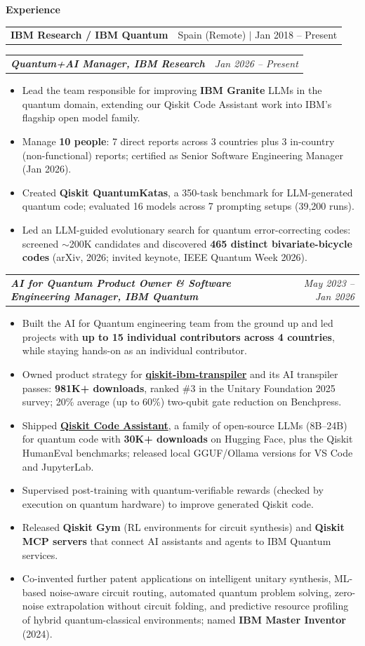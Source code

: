 \documentclass[a4paper,10pt]{article}
\makeatletter
\newcommand{\cvsection}[1]{%
  \vspace{2.5mm}%
  \begin{tcolorbox}{\headfont\bfseries\large\color{accent} #1}\end{tcolorbox}%
  \vspace{-1.5mm}%
}
\newcommand{\employer}[2]{%
  \begin{tabularx}{\linewidth}{@{}X r@{}}
    {\headfont\bfseries\large #1} & \footnotesize #2
  \end{tabularx}\par\vspace{0.6mm}}
\newcommand{\role}[2]{%
  \begin{tabularx}{\linewidth}{@{}X r@{}}
    \textbf{\textit{#1}} & \textit{\footnotesize #2}
  \end{tabularx}\par}
\newenvironment{bullets}
  {\begin{justify}\begin{itemize}[leftmargin=3ex, rightmargin=0.5ex, noitemsep, topsep=0.8mm, labelsep=1.2mm]\small}
  {\end{itemize}\end{justify}\vspace{1.2mm}}
\makeatother
\begin{document}
\cvsection{Experience}

\employer{IBM Research / IBM Quantum}{Spain (Remote) $\vert$ Jan 2018 -- Present}

\role{Quantum+AI Manager, IBM Research}{Jan 2026 -- Present}
\begin{bullets}
  \item Lead the team responsible for improving \textbf{IBM Granite} LLMs in the quantum domain, extending our Qiskit Code Assistant work into IBM's flagship open model family.
  \item Manage \textbf{10 people}: 7 direct reports across 3 countries plus 3 in-country (non-functional) reports; certified as Senior Software Engineering Manager (Jan 2026).
  \item Created \textbf{Qiskit QuantumKatas}, a 350-task benchmark for LLM-generated quantum code; evaluated 16 models across 7 prompting setups (39,200 runs).
  \item Led an LLM-guided evolutionary search for quantum error-correcting codes: screened $\sim$200K candidates and discovered \textbf{465 distinct bivariate-bicycle codes} (arXiv, 2026; invited keynote, IEEE Quantum Week 2026).
\end{bullets}

\role{AI for Quantum Product Owner \textnormal{\&} Software Engineering Manager, IBM Quantum}{May 2023 -- Jan 2026}
\begin{bullets}
  \item Built the AI for Quantum engineering team from the ground up and led projects with \textbf{up to 15 individual contributors across 4 countries}, while staying hands-on as an individual contributor.
  \item Owned product strategy for \textbf{\href{https://github.com/Qiskit/qiskit-ibm-transpiler}{qiskit-ibm-transpiler}} and its AI transpiler passes: \textbf{981K+ downloads}, ranked \#3 in the Unitary Foundation 2025 survey; 20\% average (up to 60\%) two-qubit gate reduction on Benchpress.
  \item Shipped \textbf{\href{https://huggingface.co/collections/Qiskit/qiskit-llms-67337b513e8718191b0a6ff6}{Qiskit Code Assistant}}, a family of open-source LLMs (8B--24B) for quantum code with \textbf{30K+ downloads} on Hugging Face, plus the Qiskit HumanEval benchmarks; released local GGUF/Ollama versions for VS Code and JupyterLab.
  \item Supervised post-training with quantum-verifiable rewards (checked by execution on quantum hardware) to improve generated Qiskit code.
  \item Released \textbf{Qiskit Gym} (RL environments for circuit synthesis) and \textbf{Qiskit MCP servers} that connect AI assistants and agents to IBM Quantum services.
  \item Co-invented further patent applications on intelligent unitary synthesis, ML-based noise-aware circuit routing, automated quantum problem solving, zero-noise extrapolation without circuit folding, and predictive resource profiling of hybrid quantum-classical environments; named \textbf{IBM Master Inventor} (2024).
\end{bullets}
\end{document}
